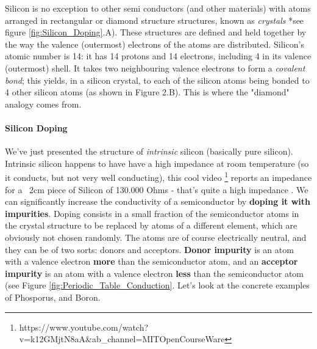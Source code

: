 Silicon is no exception to other semi conductors (and other materials) with atoms arranged in rectangular or diamond structure structures, known as \textit{crystals} *see figure \ref{fig:Silicon_Doping}.A). These structures are defined and held together by the way the valence (outermost) electrons of the atoms are distributed. Silicon's atomic number is 14: it has 14 protons and 14 electrons, including 4 in its valence (outermost) shell. It takes two neighbouring valence electrons to form a \textit{covalent bond}; this yields, in a silicon crystal, to each of the silicon atoms being bonded to 4 other silicon atoms (as shown in Figure 2.B). This is where the "diamond" analogy comes from. 
 
\paragraph{Silicon Doping}

We've just presented the structure of \textit{intrinsic} silicon (basically pure silicon). Intrinsic silicon happens to have have a high impedance at room temperature (so it conducts, but not very well conducting), this cool video \footnote{https://www.youtube.com/watch?v=k12GMjtN8aA&ab_channel=MITOpenCourseWare} reports an impedance for a ~2cm piece of Silicon of 130.000 Ohms - that's quite a high impedance . We can significantly increase the conductivity of a semiconductor by \textbf{doping it with impurities}. Doping consists in a small fraction of the semiconductor atoms in the crystal structure to be replaced by atoms of a different element, which are obviously not chosen randomly. The atoms are of course electrically neutral, and they can be of two sorts: donors and acceptors. \textbf{Donor impurity} is an atom with a valence electron \textbf{more} than the semiconductor atom, and an \textbf{acceptor impurity} is an atom with a valence electron \textbf{less} than the semiconductor atom (see Figure \ref{fig:Periodic_Table_Conduction}. Let's look at the concrete examples of Phosporus, and Boron. \\

